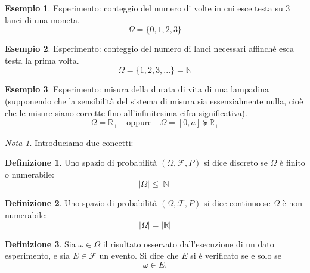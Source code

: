 \documentclass{article}
\theoremstyle{plain}
\theoremstyle{definition}
\newtheorem{definizione}{Definizione}[section]
\newtheorem{esempio}{Esempio}[section]
\theoremstyle{remark}
\newtheorem*{nota}{Nota}
\begin{document}
\begin{esempio}
	Esperimento: conteggio del numero di volte in cui esce testa su 3 lanci di una moneta.
	\begin{equation*}
		\Omega=\{0,1,2,3\}
	\end{equation*}
\end{esempio}
\begin{esempio}
	Esperimento: conteggio del numero di lanci necessari affinchè esca testa la prima volta.
	\begin{equation*}
		\Omega=\{1,2,3,...\}=\mathbb{N}
	\end{equation*}
\end{esempio}
\begin{esempio}
	Esperimento: misura della durata di vita di una lampadina (supponendo che la sensibilità del sistema di misura sia essenzialmente nulla, cioè che le misure siano corrette fino all'infinitesima cifra significativa).
	\begin{equation*}
		\Omega=\mathds{R}_+\quad\text{oppure}\quad\Omega=[0,a]\subsetneqq\mathds{R}_+
	\end{equation*}
\end{esempio}
\begin{nota}
	Introduciamo due concetti:
	\begin{definizione}
		Uno spazio di probabilità $(\Omega,\mathcal{F},P)$ si dice discreto se $\Omega$ è finito o numerabile:
		\begin{equation*}
			\lvert\Omega\rvert\leq\lvert\mathbb{N}\rvert
		\end{equation*}
	\end{definizione}
	\begin{definizione}
		Uno spazio di probabilità $(\Omega,\mathcal{F},P)$ si dice continuo se $\Omega$ è non numerabile:
		\begin{equation*}
			\lvert\Omega\rvert=\lvert\mathds{R}\rvert
		\end{equation*}
	\end{definizione}
\end{nota}
\begin{definizione}
	Sia $\omega\in\Omega$ il risultato osservato dall'esecuzione di un dato esperimento, e sia $E\in\mathcal{F}$ un evento. Si dice che $E$ si è verificato se e solo se 
	\begin{equation*}
		\omega\in E\text{.}
	\end{equation*}
\end{definizione}
\end{document}
